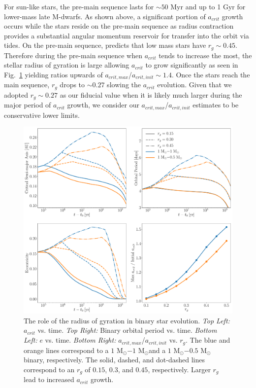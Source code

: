 For sun-like stars, the pre-main sequence lasts for ${\sim} 50$ Myr and up to 1 Gyr for lower-mass late M-dwarfs.  As shown above, a significant portion of  $a_{crit}$ growth occurs while the stars reside on the pre-main sequence as radius contraction provides a substantial angular momentum reservoir for transfer into the orbit via tides.  On the pre-main sequence, \citet{Baraffe2015} predicts that low mass stars have $r_{g}{\sim}0.45$.  Therefore during the pre-main sequence when $a_{crit}$ tends to increase the most, the stellar radius of gyration is large allowing $a_{crit}$ to grow significantly as seen in Fig.~\ref{fig:var_rg} yielding ratios upwards of $a_{crit,max}$/$a_{crit,init} {\sim} 1.4$.  Once the stars reach the main sequence, $r_{g}$ drops to ${\sim}0.27$ slowing the $a_{crit}$ evolution.  Given that we adopted $r_{g}{\sim}0.27$ as our fiducial value when it is likely much larger during the major period of $a_{crit}$ growth, we consider our $a_{crit,max}$/$a_{crit,init}$ estimates to be conservative lower limits. 

\begin{figure}[t]
	\includegraphics[width=\textwidth]{var_rg.pdf}
    \caption{The role of the radius of gyration in binary star evolution. {\it Top Left:} $a_{crit}$ vs. time.  {\it Top Right:} Binary orbital period vs. time. {\it Bottom Left:} $e$ vs. time. {\it Bottom Right:} $a_{crit,max}$/$a_{crit,init}$ vs. $r_g$.  The blue and orange lines correspond to a $1$ M$_{\odot}$$-1$ M$_{\odot}$and a $1$ M$_{\odot}$$-0.5$ M$_{\odot}$ binary, respectively.  The solid, dashed, and dot-dashed lines correspond to an $r_g$ of $0.15$, $0.3$, and $0.45$, respectively.  Larger $r_g$ lead to increased $a_{crit}$ growth.}
    \label{fig:var_rg}
\end{figure}

